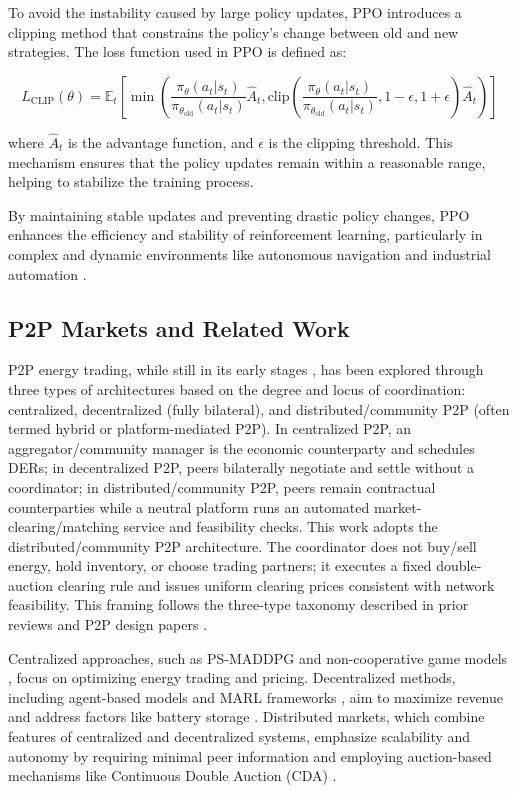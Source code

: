 \documentclass[preprint,12pt]{elsarticle}
\begin{document}
To avoid the instability caused by large policy updates, PPO introduces a clipping method that constrains the policy's change between old and new strategies. The loss function used in PPO is defined as:

\[
L_{\text{CLIP}}(\theta) = \mathbb{E}_t \left[ \min \left( \frac{\pi_{\theta}(a_t|s_t)}{\pi_{\theta_{\text{old}}}(a_t|s_t)} \hat{A}_t, \text{clip}\left( \frac{\pi_{\theta}(a_t|s_t)}{\pi_{\theta_{\text{old}}}(a_t|s_t)}, 1-\epsilon, 1+\epsilon \right) \hat{A}_t \right) \right]
\]

where \(\hat{A}_t\) is the advantage function, and \(\epsilon\) is the clipping threshold. This mechanism ensures that the policy updates remain within a reasonable range, helping to stabilize the training process.

By maintaining stable updates and preventing drastic policy changes, PPO enhances the efficiency and stability of reinforcement learning, particularly in complex and dynamic environments like autonomous navigation and industrial automation \cite{wang2024research}.


\subsection{P2P Markets and Related Work}

P2P energy trading, while still in its early stages \cite{wongthongtham2021blockchain}, has been explored through three types of architectures based on the degree and locus of coordination: centralized, decentralized (fully bilateral), and distributed/community P2P (often termed hybrid or platform-mediated P2P). In centralized P2P, an aggregator/community manager is the economic counterparty and schedules DERs; in decentralized P2P, peers bilaterally negotiate and settle without a coordinator; in distributed/community P2P, peers remain contractual counterparties while a neutral platform runs an automated market-clearing/matching service and feasibility checks. This work adopts the distributed/community P2P architecture. The coordinator does not buy/sell energy, hold inventory, or choose trading partners; it executes a fixed double-auction clearing rule and issues uniform clearing prices consistent with network feasibility. This framing follows the three-type taxonomy described in prior reviews and P2P design papers \cite{tushar2020peer, zhou2020state, qiu2022mean}.


Centralized approaches, such as PS-MADDPG \cite{qiu2021scalable} and non-cooperative game models \cite{zhang2019p2p}, focus on optimizing energy trading and pricing. Decentralized methods, including agent-based models \cite{guimaraes2021agent} and MARL frameworks \cite{zhou2020decentralized}, aim to maximize revenue and address factors like battery storage \cite{elkazaz2021hierarchical}. Distributed markets, which combine features of centralized and decentralized systems, emphasize scalability and autonomy by requiring minimal peer information and employing auction-based mechanisms like Continuous Double Auction (CDA) \cite{khorasany2018market, qiu2022mean}.
\end{document}
